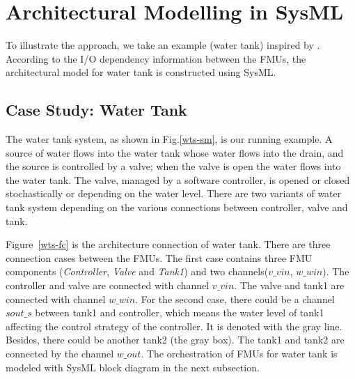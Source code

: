 \section{Architectural Modelling in SysML}
\label{sec:sysml}
To illustrate the approach, we take an example (water tank) inspired by \cite{AmalioPCW16}. According to the I/O dependency information between the FMUs, the architectural model for water tank is constructed using SysML.
\subsection{Case Study: Water Tank}

The water tank system, as shown in Fig.\ref{wts-sm}, is our running example. A source of water flows into the water tank whose water flows into the drain, and the source is controlled by a valve; when the valve is open the water flows into the water tank. The valve, managed by a software controller, is opened or closed stochastically or depending on the water level. There are two variants of water tank system depending on the various connections between controller, valve and tank. 

Figure~\ref{wts-fc} is the architecture connection of water tank. There are three connection cases between the FMUs. The first case contains three FMU components (\emph{Controller}, \emph{Valve} and \emph{ Tank1}) and two channels($v \_ vin$, $w \_ win$). The controller and valve are connected with channel $v \_ vin$. The valve and tank1 are connected with channel $w \_ win$. For the second case, there could be a channel $sout \_ s$ between tank1 and controller, which means the water level of tank1 affecting the control strategy of the controller. It is denoted with the gray line. Besides, there could be another tank2 (the gray box). The tank1 and tank2 are connected by the channel $w \_ out$. The orchestration of FMUs for water tank is modeled with SysML block diagram in the next subsection.
\begin{figure}[htbp]
\end{figure}
